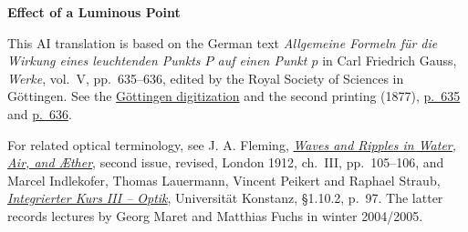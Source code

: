 \clearpage
{}
\begin{center}\textbf{Effect of a Luminous Point}\end{center}
\noindent This AI translation is based on the German text \textit{Allgemeine Formeln für die Wirkung eines leuchtenden Punkts \(P\) auf einen Punkt \(p\)} in Carl Friedrich Gauss, \textit{Werke}, vol.~V, pp.~635--636, edited by the Royal Society of Sciences in Göttingen. See the \href{https://gdz.sub.uni-goettingen.de/id/PPN236006339}{Göttingen digitization} and the second printing (1877), \href{https://archive.org/download/Werkecarlf05gausrich/page/n646}{p.~635} and \href{https://archive.org/download/Werkecarlf05gausrich/page/n647}{p.~636}.
\par\smallskip\noindent For related optical terminology, see J. A. Fleming, \href{https://www.gutenberg.org/ebooks/71757}{\textit{Waves and Ripples in Water, Air, and Æther}}, second issue, revised, London 1912, ch.~III, pp.~105--106, and Marcel Indlekofer, Thomas Lauermann, Vincent Peikert and Raphael Straub, \href{https://theorie.physik.uni-konstanz.de/lsfuchs/lectures/ik30405/ik3optik1802.pdf#page=97}{\textit{Integrierter Kurs III -- Optik}}, Universität Konstanz, §1.10.2, p.~97. The latter records lectures by Georg Maret and Matthias Fuchs in winter 2004/2005.
\clearpage
